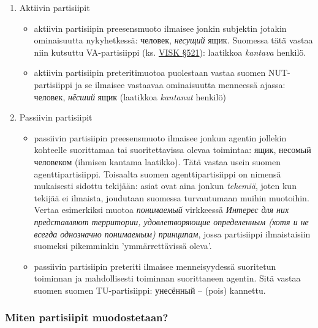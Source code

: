 \documentclass[]{scrartcl}
\providecommand{\tightlist}{%
  \setlength{\itemsep}{0pt}\setlength{\parskip}{0pt}}
\begin{document}
\begin{enumerate}
\def\labelenumi{\arabic{enumi}.}
\tightlist
\item
  Aktiivin partisiipit

  \begin{itemize}
  \tightlist
  \item
    aktiivin partisiipin preesensmuoto ilmaisee jonkin subjektin jotakin
    ominaisuutta nykyhetkessä: человек, \emph{несущий} ящик. Suomessa
    tätä vastaa niin kutsuttu VA-partisiippi (ks.
    \href{http://scripta.kotus.fi/visk/sisallys.php?p=521}{VISK §521}):
    laatikkoa \emph{kantava} henkilö.
  \item
    aktiivin partisiipin preteritimuotoa puolestaan vastaa suomen
    NUT-partisiippi ja se ilmaisee vastaavaa ominaisuutta menneessä
    ajassa: человек, \emph{нёсший} ящик (laatikkoa \emph{kantanut}
    henkilö)
  \end{itemize}
\item
  Passiivin partisiipit

  \begin{itemize}
  \tightlist
  \item
    passiivin partisiipin preesensmuoto ilmaisee jonkun agentin jollekin
    kohteelle suorittamaa tai suoritettavissa olevaa toimintaa: ящик,
    несомый человеком (ihmisen kantama laatikko). Tätä vastaa usein
    suomen agenttipartisiippi. Toisaalta suomen agenttipartisiippi on nimensä
          mukaisesti sidottu tekijään: asiat ovat aina jonkun \emph{tekemiä}, 
          joten kun tekijää ei ilmaista, joudutaan suomessa turvautumaan muihin muotoihin.
    Vertaa esimerkiksi muotoa \emph{понимаемый} virkkeessä
          \emph{Интерес для них представляют территории, удовлетворяющие определенным (хотя и
          не всегда однозначно понимаемым) принципам}, jossa partisiippi
          ilmaistaisiin suomeksi pikemminkin 'ymmärrettävissä oleva'.

  \item
    passiivin partisiipin preteriti ilmaisee menneisyydessä suoritetun
    toiminnan ja mahdollisesti toiminnan suorittaneen agentin. Sitä
    vastaa suomen suomen TU-partisiippi: унесённый -- (pois) kannettu.
  \end{itemize}
\end{enumerate}

\subsubsection{Miten partisiipit
muodostetaan?}\label{miten-partisiipit-muodostetaan}
\end{document}
